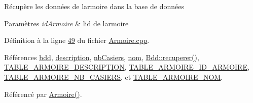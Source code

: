 Récupère les données de l\textquotesingle{}armoire dans la base de données 
\begin{DoxyParams}{Paramètres}
{\em id\+Armoire} & l\textquotesingle{}id de l\textquotesingle{}armoire \\
\hline
\end{DoxyParams}


Définition à la ligne \hyperlink{_armoire_8cpp_source_l00049}{49} du fichier \hyperlink{_armoire_8cpp_source}{Armoire.\+cpp}.



Références \hyperlink{_armoire_8h_source_l00065}{bdd}, \hyperlink{_armoire_8h_source_l00068}{description}, \hyperlink{_armoire_8h_source_l00069}{nb\+Casiers}, \hyperlink{_armoire_8h_source_l00067}{nom}, \hyperlink{_bdd_8cpp_source_l00187}{Bdd\+::recuperer()}, \hyperlink{_armoire_8h_source_l00031}{T\+A\+B\+L\+E\+\_\+\+A\+R\+M\+O\+I\+R\+E\+\_\+\+D\+E\+S\+C\+R\+I\+P\+T\+I\+ON}, \hyperlink{_armoire_8h_source_l00029}{T\+A\+B\+L\+E\+\_\+\+A\+R\+M\+O\+I\+R\+E\+\_\+\+I\+D\+\_\+\+A\+R\+M\+O\+I\+RE}, \hyperlink{_armoire_8h_source_l00032}{T\+A\+B\+L\+E\+\_\+\+A\+R\+M\+O\+I\+R\+E\+\_\+\+N\+B\+\_\+\+C\+A\+S\+I\+E\+RS}, et \hyperlink{_armoire_8h_source_l00030}{T\+A\+B\+L\+E\+\_\+\+A\+R\+M\+O\+I\+R\+E\+\_\+\+N\+OM}.



Référencé par \hyperlink{_armoire_8cpp_source_l00022}{Armoire()}.


